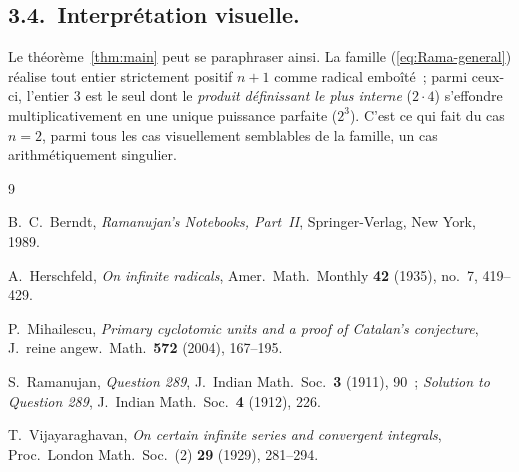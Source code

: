 \documentclass[12pt,a4paper]{article}
\begin{document}
\subsection*{3.4.\ Interprétation visuelle.}

Le théorème~\ref{thm:main} peut se paraphraser ainsi. La famille
(\ref{eq:Rama-general}) réalise tout entier strictement positif $n+1$ comme
radical emboîté~; parmi ceux-ci, l'entier $3$ est le seul dont le
\emph{produit définissant le plus interne} ($2 \cdot 4$) s'effondre
multiplicativement en une unique puissance parfaite ($2^3$). C'est ce qui
fait du cas $n = 2$, parmi tous les cas visuellement semblables de la
famille, un cas arithmétiquement singulier.

\begin{thebibliography}{9}

B.\ C.\ Berndt,
\emph{Ramanujan's Notebooks, Part~II},
Springer-Verlag, New York, 1989.

A.\ Herschfeld,
\emph{On infinite radicals},
Amer.\ Math.\ Monthly \textbf{42} (1935), no.\ 7, 419--429.

P.\ Mihailescu,
\emph{Primary cyclotomic units and a proof of Catalan's conjecture},
J.\ reine angew.\ Math.\ \textbf{572} (2004), 167--195.

S.\ Ramanujan,
\emph{Question 289},
J.\ Indian Math.\ Soc.\ \textbf{3} (1911), 90~;
\emph{Solution to Question 289},
J.\ Indian Math.\ Soc.\ \textbf{4} (1912), 226.

T.\ Vijayaraghavan,
\emph{On certain infinite series and convergent integrals},
Proc.\ London Math.\ Soc.\ (2) \textbf{29} (1929), 281--294.

\end{thebibliography}
\end{document}
